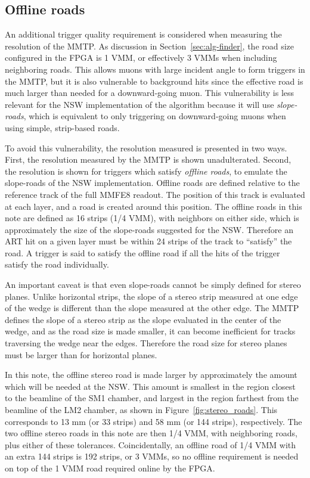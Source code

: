 \subsection{Offline roads}
\label{sec:perf-roads}

An additional trigger quality requirement is considered when measuring the resolution of the MMTP. As discussion in Section~\ref{sec:alg-finder}, the road size configured in the FPGA is 1 VMM, or effectively 3 VMMs when including neighboring roads. This allows muons with large incident angle to form triggers in the MMTP, but it is also vulnerable to background hits since the effective road is much larger than needed for a downward-going muon. This vulnerability is less relevant for the NSW implementation of the algorithm because it will use \textit{slope-roads}, which is equivalent to only triggering on downward-going muons when using simple, strip-based roads.

To avoid this vulnerability, the resolution measured is presented in two ways. First, the resolution measured by the MMTP is shown unadulterated. Second, the resolution is shown for triggers which satisfy \textit{offline roads}, to emulate the slope-roads of the NSW implementation. Offline roads are defined relative to the reference track of the full MMFE8 readout. The position of this track is evaluated at each layer, and a road is created around this position. The offline roads in this note are defined as 16 strips (1/4 VMM), with neighbors on either side, which is approximately the size of the slope-roads suggested for the NSW. Therefore an ART hit on a given layer must be within 24 strips of the track to ``satisfy'' the road. A trigger is said to satisfy the offline road if all the hits of the trigger satisfy the road individually.

An important caveat is that even slope-roads cannot be simply defined for stereo planes. Unlike horizontal strips, the slope of a stereo strip measured at one edge of the wedge is different than the slope measured at the other edge. The MMTP defines the slope of a stereo strip as the slope evaluated in the center of the wedge, and as the road size is made smaller, it can become inefficient for tracks traversing the wedge near the edges. Therefore the road size for stereo planes must be larger than for horizontal planes.

In this note, the offline stereo road is made larger by approximately the amount which will be needed at the NSW. This amount is smallest in the region closest to the beamline of the SM1 chamber, and largest in the region farthest from the beamline of the LM2 chamber, as shown in Figure~\ref{fig:stereo_roads}. This corresponds to 13 mm (or 33 strips) and 58 mm (or 144 strips), respectively. The two offline stereo roads in this note are then 1/4 VMM, with neighboring roads, plus either of these tolerances. Coincidentally, an offline road of 1/4 VMM with an extra 144 strips is 192 strips, or 3 VMMs, so no offline requirement is needed on top of the 1 VMM road required online by the FPGA.

